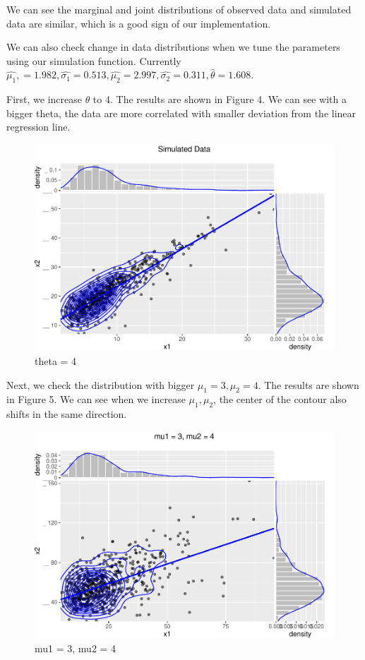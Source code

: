 \documentclass[11pt,]{article}
\begin{document}
We can see the marginal and joint distributions of observed data and
simulated data are similar, which is a good sign of our implementation.

We can also check change in data distributions when we tune the
parameters using our simulation function. Currently
\(\hat{\mu_{1}},= 1.982, \hat{\sigma_{1}}=0.513,\hat{\mu_{2}}=2.997,\hat{\sigma_{2}}=0.311,\hat{\theta}=1.608\).

First, we increase \(\theta\) to 4. The results are shown in Figure 4.
We can see with a bigger theta, the data are more correlated with
smaller deviation from the linear regression line.

\begin{figure}
\centering
\includegraphics{figs/unnamed-chunk-8.pdf}
\caption{theta = 4}
\end{figure}

Next, we check the distribution with bigger \(\mu_1=3, \mu_2=4\). The
results are shown in Figure 5. We can see when we increase
\(\mu_1,\mu_2\), the center of the contour also shifts in the same
direction.

\begin{figure}
\centering
\includegraphics{figs/unnamed-chunk-9.pdf}
\caption{mu1 = 3, mu2 = 4}
\end{figure}
\end{document}
